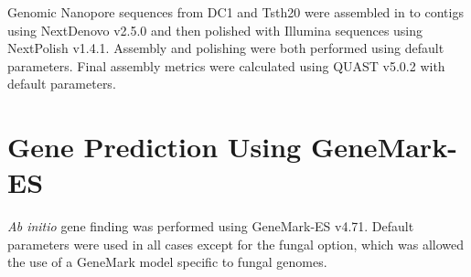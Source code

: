 Genomic Nanopore sequences from DC1 and Tsth20 were assembled in to
contigs using NextDenovo\cite{Hu2024} v2.5.0 and then polished with
Illumina sequences using NextPolish\cite{Hu2020} v1.4.1. Assembly and
polishing were both performed using default parameters. Final assembly
metrics were calculated using QUAST v5.0.2\cite{Gurevich2013} with
default parameters.






\section{Gene Prediction Using GeneMark-ES}

\textit{Ab initio} gene finding was performed using GeneMark-ES
v4.71\cite{Borodovsky2011}. Default parameters were used in all cases
except for the fungal option, which was allowed the use of a GeneMark
model specific to fungal genomes.

